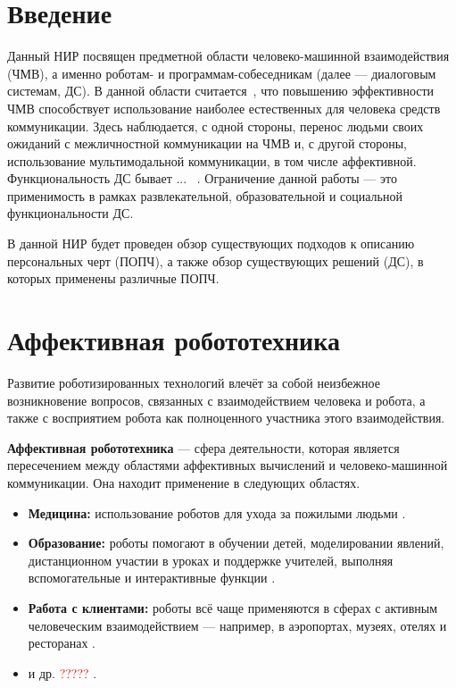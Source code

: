 \chapter{Введение}

Данный НИР посвящен предметной области человеко-машинной взаимодействия (ЧМВ), а именно роботам- и программам-собеседникам (далее --- диалоговым системам, ДС). В данной области считается~\cite{Ronzhin-Karpov-Li}, что повышению эффективности ЧМВ способствует использование наиболее естественных для человека средств коммуникации. Здесь наблюдается, с одной стороны, перенос людьми своих ожиданий с межличностной коммуникации на ЧМВ и, с другой стороны, использование мультимодальной коммуникации, в том числе аффективной. Функциональность ДС бывает ... ~\cite{Волкова Л.Л. О функциональности диалоговых систем... ?Лингвистика и Лингводидактика в неязыковом вузе...}. Ограничение данной работы --- это применимость в рамках развлекательной, образовательной и социальной функциональности ДС.

В данной НИР будет проведен обзор существующих подходов к описанию персональных черт (ПОПЧ), а также обзор существующих решений (ДС), в которых применены различные ПОПЧ. 


\chapter{Аффективная робототехника}

Развитие роботизированных технологий влечёт за собой неизбежное возникновение вопросов, связанных с взаимодействием человека и робота, а также с восприятием робота как полноценного участника этого взаимодействия.


\textbf{Аффективная робототехника} --- сфера деятельности, которая является пересечением между областями аффективных вычислений и человеко-машинной коммуникации. Она находит применение в следующих областях. 

\begin{itemize}
	\item \textbf{Медицина:} использование роботов для ухода за пожилыми людьми \cite{affect-rob-in-med, affect-rob-in-med-2}.
	
	\item \textbf{Образование:} роботы помогают в обучении детей, моделировании явлений, дистанционном участии в уроках и поддержке учителей, выполняя вспомогательные и интерактивные функции \cite{affect-rob-in-edu}.
	
	\item \textbf{Работа с клиентами:} роботы всё чаще применяются в сферах с активным человеческим взаимодействием — например, в аэропортах, музеях, отелях и ресторанах \cite{affect-rob-in-serv}.
	
	\item и др. \textcolor{red}{?????} \cite{affect-rob-in-other-fields}.
\end{itemize}


